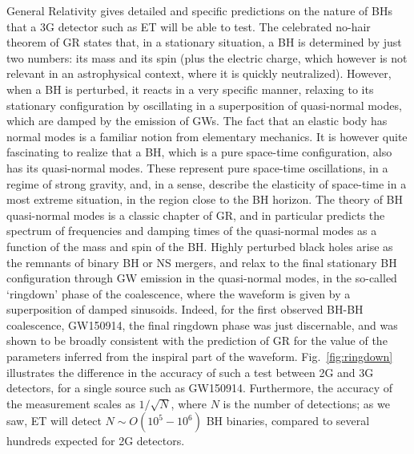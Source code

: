 General Relativity gives detailed and specific predictions on the nature of BHs that a 3G detector such as ET will be able to test. The celebrated no-hair theorem  of GR states that, in  a stationary situation, a BH is determined
by just two numbers: its mass and its spin (plus the electric charge, which however is not relevant in an astrophysical context, where it is quickly neutralized). However, when a BH is perturbed, it reacts in a very specific manner, relaxing to its stationary configuration by oscillating in a superposition of 
quasi-normal modes, which are damped by the emission of GWs. The fact that an elastic body has normal modes is a familiar notion from elementary mechanics. It is however quite fascinating to realize  that a BH, which is a pure space-time configuration, also has its quasi-normal modes. These represent pure space-time oscillations, in a regime of strong gravity, and, in a sense, describe the elasticity of space-time in a most extreme situation, in the region close to the BH horizon. The theory of BH quasi-normal modes is a classic chapter of GR,
and in particular predicts the spectrum of frequencies and damping times of the quasi-normal modes as a function of the mass and spin of the BH. Highly perturbed black holes arise as the 
remnants of binary BH or NS mergers, and relax to the final stationary BH configuration through GW emission in the quasi-normal modes, in the so-called `ringdown' phase of the coalescence, where the waveform is given by a superposition of damped sinusoids. Indeed, for the first observed BH-BH coalescence, GW150914, the final ringdown phase was just discernable, and was shown to be broadly consistent with the prediction of GR for the value of the parameters inferred from  the inspiral part of the waveform.
Fig.~\ref{fig:ringdown} illustrates the difference in the accuracy of such a test between 2G and 3G detectors, for a single source such as GW150914. Furthermore, 
the accuracy of the measurement scales as $1/\sqrt{N}$, where $N$ is the number of detections;
as we saw, ET will detect $N\sim O(10^5-10^6)$ BH binaries, compared to several hundreds expected for 2G detectors.


